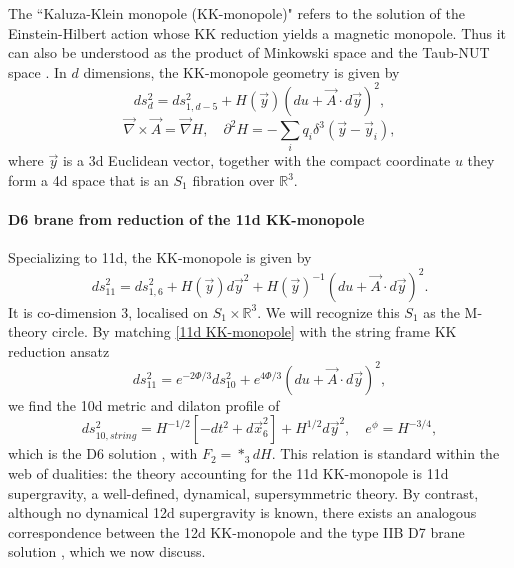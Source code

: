 The ``Kaluza-Klein monopole (KK-monopole)" \cite{Gross:1983hb,Sorkin:1983ns} refers to the solution of the Einstein-Hilbert action whose KK reduction yields a magnetic monopole.
Thus it can also be understood as the product of Minkowski space and the Taub-NUT space \cite{Ortin:2015hya}.
In $d$ dimensions, the KK-monopole geometry is given by
\cite{Eguchi:1980jx}
\begin{equation}
ds_d^2 = ds_{1,d-5}^2 + H(\vec{y})(du + \vec{A}\cdot d\vec{y})^2,
\label{d-dim KK-monopole}
\end{equation}
\begin{equation}
\vec{\nabla} \times \vec A = \vec\nabla H,\quad
\partial^2 H=-\sum_i q_i \delta^3(\vec{y}-\vec{y}_i),
\label{kk monopole einstein eqs}
\end{equation}
where $\vec{y}$ is a 3d Euclidean vector, together with the compact coordinate $u$ they form a 4d space that is an $S_1$ fibration over $\mathbb{R}^3$.

\paragraph{D6 brane from reduction of the 11d KK-monopole}
Specializing to 11d, the KK-monopole is given by
\begin{equation}
ds_{11}^2=ds_{1,6}^2 + H(\vec{y})d\vec{y}^2+H(\vec{y})^{-1}(du+\vec{A}\cdot d\vec{y})^2.
\label{11d KK-monopole}
\end{equation}
It is co-dimension 3, localised on $S_1\times\mathbb{R}^3$. 
We will recognize this $S_1$ as the M-theory circle.
By matching \eqref{11d KK-monopole} with the string frame KK reduction ansatz
\begin{equation}
ds_{11}^2=e^{-2\Phi/3}ds_{10}^2+e^{4\Phi/3}(du+ \vec{A}\cdot d\vec{y})^2,
\label{string frame KK reduction ansatz}
\end{equation}
we find the 10d metric and dilaton profile of
\begin{equation}
ds_{10,string}^2=H^{-1/2}[-dt^2+d\vec{x}_6^2] + H^{1/2}d\vec{y}^2,\quad
e^\phi=H^{-3/4},
\end{equation}
which is the D6 solution \cite{Horowitz:1991cd,Townsend:1995kk}, with $F_2=*_3 dH$.
This relation is standard within the web of dualities: the theory accounting for the 11d KK-monopole is 11d supergravity, a well-defined, dynamical, supersymmetric theory.
By contrast, although no dynamical 12d supergravity is known, there exists an analogous correspondence between the 12d KK-monopole and the type IIB D7 brane solution \cite{Tseytlin:1996ne}, which we now discuss.

